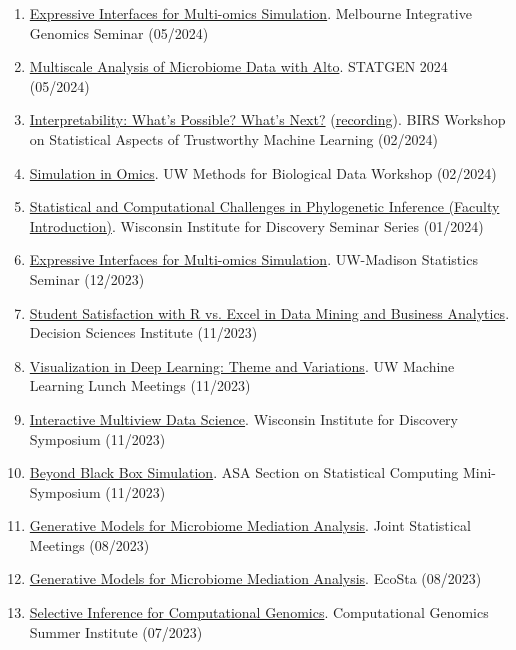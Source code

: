 \documentclass[letterpaper]{article}
\begin{document}
\begin{enumerate}
  \item \href{https://krisrs1128.github.io/talks/2024/20240531/20240531.html#1}{Expressive Interfaces for Multi-omics Simulation}. Melbourne Integrative Genomics Seminar (05/2024)
  \item \href{https://krisrs1128.github.io/talks/2024/20240503/20240503.html#1}{Multiscale Analysis of Microbiome Data with Alto}. STATGEN 2024 (05/2024)
  \item \href{https://krisrs1128.github.io/talks/2024/20240212/20240212.html}{Interpretability: What's Possible? What's Next?} (\href{https://www.birs.ca/events/2024/5-day-workshops/24w5284/videos/watch/202402120904-Sankaran.html}{recording}). BIRS Workshop on Statistical Aspects of Trustworthy Machine Learning (02/2024)
  \item \href{https://github.com/krisrs1128/talks/blob/master/2024/20240207/20240207.Rmd}{Simulation in Omics}. UW Methods for Biological Data Workshop (02/2024)
  \item \href{https://krisrs1128.github.io/talks/2024/20240131/20240131.html#1}{Statistical and Computational Challenges in Phylogenetic Inference (Faculty Introduction)}. Wisconsin Institute for Discovery Seminar Series (01/2024)
  \item \href{https://go.wisc.edu/4y9176}{Expressive Interfaces for Multi-omics Simulation}. UW-Madison Statistics Seminar (12/2023)
  \item \href{https://github.com/krisrs1128/talks/blob/master/2023/20231118/dsi-kris.pptx}{Student Satisfaction with R vs. Excel in Data Mining and Business Analytics}. Decision Sciences Institute (11/2023)
  \item \href{https://go.wisc.edu/9p83o9}{Visualization in Deep Learning: Theme and Variations}. UW Machine Learning Lunch Meetings (11/2023)
  \item \href{https://go.wisc.edu/02jao8}{Interactive Multiview Data Science}. Wisconsin Institute for Discovery Symposium (11/2023)
  \item \href{https://go.wisc.edu/fg7wr4}{Beyond Black Box Simulation}. ASA Section on Statistical Computing Mini-Symposium (11/2023)
  \item \href{https://drive.google.com/file/d/1lQBb665vsyILnknqMdGZMPkj-7Nhhgqw/view?usp=drive_link}{Generative Models for Microbiome Mediation Analysis}. Joint Statistical Meetings (08/2023)
  \item \href{https://go.wisc.edu/77q6rs}{Generative Models for Microbiome Mediation Analysis}. EcoSta (08/2023)
  \item \href{https://go.wisc.edu/7l1k95}{Selective Inference for Computational Genomics}. Computational Genomics Summer Institute (07/2023)

\end{enumerate}
\end{document}
